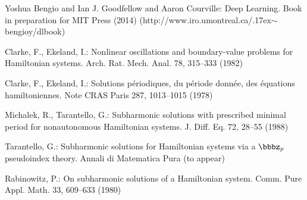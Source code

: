 \documentclass{llncs}
\begin{document}
%
%
\begin{thebibliography}{5}
%


Yoshua Bengio and Ian J. Goodfellow and Aaron Courville:
Deep Learning.
Book in preparation for MIT Press (2014)
\newcommand{\mytilde}{\raise.17ex\hbox{$\scriptstyle\mathtt{\sim}$}}
(http://www.iro.umontreal.ca/\mytilde{}bengioy/dlbook)


Clarke, F., Ekeland, I.:
Nonlinear oscillations and
boundary-value problems for Hamiltonian systems.
Arch. Rat. Mech. Anal. 78, 315--333 (1982)

Clarke, F., Ekeland, I.:
Solutions p\'{e}riodiques, du
p\'{e}riode donn\'{e}e, des \'{e}quations hamiltoniennes.
Note CRAS Paris 287, 1013--1015 (1978)

Michalek, R., Tarantello, G.:
Subharmonic solutions with prescribed minimal
period for nonautonomous Hamiltonian systems.
J. Diff. Eq. 72, 28--55 (1988)

Tarantello, G.:
Subharmonic solutions for Hamiltonian
systems via a $\bbbz_{p}$ pseudoindex theory.
Annali di Matematica Pura (to appear)

Rabinowitz, P.:
On subharmonic solutions of a Hamiltonian system.
Comm. Pure Appl. Math. 33, 609--633 (1980)

\end{thebibliography}
\end{document}
